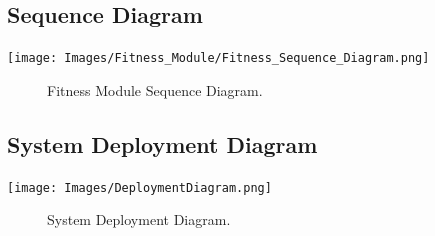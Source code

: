 \documentclass[a4paper, 12pt, one column]{article}
\begin{document}
\subsection{Sequence Diagram}
        \texttt{[image: Images/Fitness\_Module/Fitness\_Sequence\_Diagram.png]}
        \begin{figure}[h]
            \caption{Fitness Module Sequence Diagram.}
        \end{figure}










        
        
        
        
        
\begin{center}
\section{System Deployment Diagram}
        \texttt{[image: Images/DeploymentDiagram.png]}
        \begin{figure}[h]
            \caption{System Deployment Diagram.}
        \end{figure}
        
\end{center}
        
\end{document}
